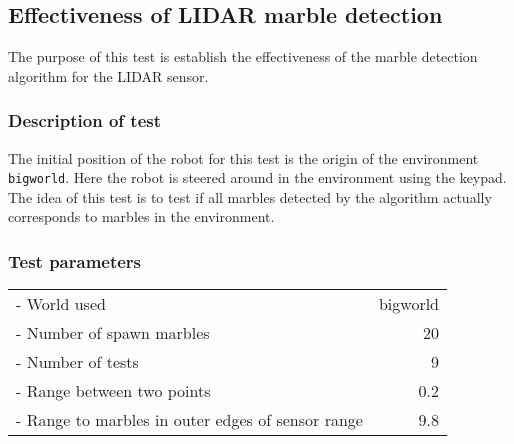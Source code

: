 \documentclass[../Head/Main.tex]{subfiles}
\begin{document}
\subsection{Effectiveness of LIDAR marble detection}

The purpose of this test is establish the effectiveness of the marble detection algorithm for the LIDAR sensor.

\subsubsection*{Description of test}
The initial position of the robot for this test is the origin of the environment \texttt{bigworld}. Here the robot is steered around in the environment using the keypad. The idea of this test is to test if all marbles detected by the algorithm actually corresponds to marbles in the environment.     

\subsubsection*{Test parameters}
\begin{tabular}{l r}
	- World used                & bigworld\\	
	- Number of spawn marbles   & 20\\
	- Number of tests           & 9\\
	- Range between two points  & 0.2\\
	- Range to marbles in outer edges of sensor range & 9.8
\end{tabular}
\end{document}
